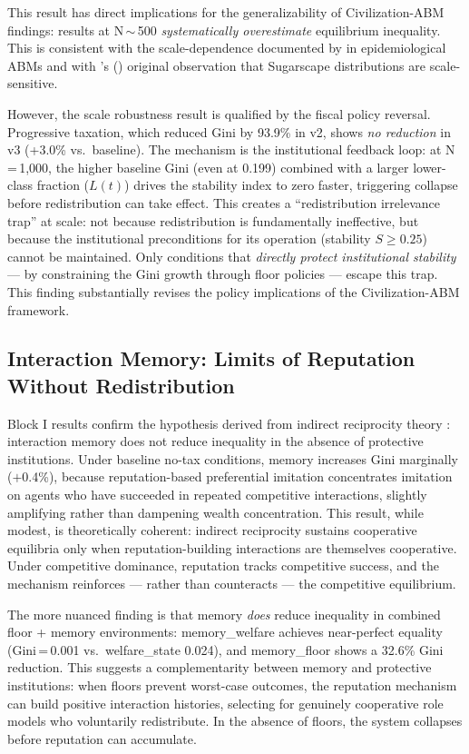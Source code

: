 \documentclass[12pt, letterpaper]{article}
\begin{document}
This result has direct implications for the generalizability of
Civilization-ABM findings: results at N\,$\sim$\,500 \emph{systematically
overestimate} equilibrium inequality. This is consistent with the
scale-dependence documented by \citet{chopra2024agenttorch} in
epidemiological ABMs and with \citeauthor{epstein1996}'s
(\citeyear{epstein1996}) original observation that Sugarscape distributions
are scale-sensitive.

However, the scale robustness result is qualified by the fiscal policy
reversal. Progressive taxation, which reduced Gini by 93.9\% in v2,
shows \emph{no reduction} in v3 (+3.0\% vs.\ baseline). The mechanism
is the institutional feedback loop: at N\,=\,1,000, the higher baseline
Gini (even at 0.199) combined with a larger lower-class fraction
($L(t)$) drives the stability index to zero faster, triggering collapse
before redistribution can take effect. This creates a ``redistribution
irrelevance trap'' at scale: not because redistribution is fundamentally
ineffective, but because the institutional preconditions for its
operation (stability $S \geq 0.25$) cannot be maintained. Only
conditions that \emph{directly protect institutional stability} ---
by constraining the Gini growth through floor policies --- escape this
trap. This finding substantially revises the policy implications of the
Civilization-ABM framework.

\subsection{Interaction Memory: Limits of Reputation Without Redistribution}

Block I results confirm the hypothesis derived from indirect
reciprocity theory \citep{nowak1998indirect}: interaction memory does
not reduce inequality in the absence of protective institutions.
Under baseline no-tax conditions, memory increases Gini marginally
($+$0.4\%), because reputation-based preferential imitation concentrates
imitation on agents who have succeeded in repeated competitive
interactions, slightly amplifying rather than dampening wealth
concentration. This result, while modest, is theoretically coherent:
indirect reciprocity sustains cooperative equilibria only when
reputation-building interactions are themselves cooperative. Under
competitive dominance, reputation tracks competitive success, and the
mechanism reinforces --- rather than counteracts --- the competitive
equilibrium.

The more nuanced finding is that memory \emph{does} reduce inequality
in combined floor + memory environments: memory\_welfare achieves
near-perfect equality (Gini\,=\,0.001 vs.\ welfare\_state 0.024),
and memory\_floor shows a 32.6\% Gini reduction. This suggests a
complementarity between memory and protective institutions: when
floors prevent worst-case outcomes, the reputation mechanism can build
positive interaction histories, selecting for genuinely cooperative
role models who voluntarily redistribute. In the absence of floors,
the system collapses before reputation can accumulate.
\end{document}
